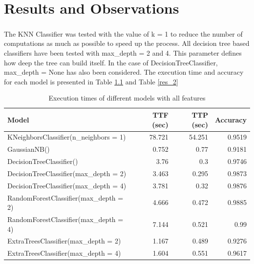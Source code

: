 \chapter{Results and Observations}
\label{ch:SC}

\paragraph{}
The KNN Classifier was tested with the value of k = 1 to reduce the number of computations as much as possible to speed up the process. All decision tree based classifiers have been tested with max\_depth = 2 and 4. This parameter defines how deep the tree can build itself. In the case of DecisionTreeClassifier, max\_depth = None has also been considered. The execution time and accuracy for each model is presented in Table \ref{res_all} and Table \ref{res_2}

\begin{table}[h]
    \caption{Execution times of different models with all features}
    \centering
    \label{res_all}
    \begin{tabular}{| l | r | r | r |}
        \hline
        \textbf{Model} & \textbf{TTF (sec)} & \textbf{TTP (sec)} & \textbf{Accuracy} \\
        \hline
        KNeighborsClassifier(n\_neighbors = 1) & 78.721 & 54.251 & 0.9519 \\
        \hline
        GaussianNB() & 0.752 & 0.77 & 0.9181 \\
        \hline
        DecisionTreeClassifier() & 3.76 & 0.3 & 0.9746 \\
        \hline
        DecisionTreeClassifier(max\_depth = 2) & 3.463 & 0.295 & 0.9873 \\
        \hline
        DecisionTreeClassifier(max\_depth = 4) & 3.781 & 0.32 & 0.9876 \\
        \hline
        RandomForestClassifier(max\_depth = 2) & 4.666 & 0.472 & 0.9885 \\
        \hline
        RandomForestClassifier(max\_depth = 4) & 7.144 & 0.521 & 0.99 \\
        \hline
        ExtraTreesClassifier(max\_depth = 2) & 1.167 & 0.489 & 0.9276 \\
        \hline
        ExtraTreesClassifier(max\_depth = 4) & 1.604 & 0.551 & 0.9617 \\
        \hline
    \end{tabular}
\end{table}

